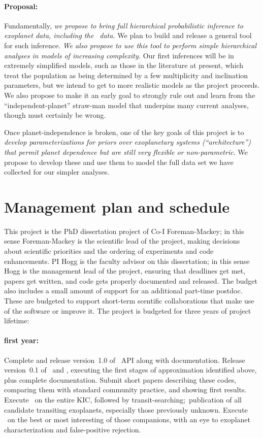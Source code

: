 \documentclass[letterpaper,12pt,preprint]{hack_aastex}
\newcommand{\kplr}{\package{kplr}}
\newcommand{\Untrendy}{\package{Untrendy}}
\newcommand{\Bart}{\package{Bart}}
\begin{document}
\paragraph{Proposal:}
Fundamentally, \emph{we propose to bring full hierarchical
  probabilistic inference to exoplanet data, including the
  \Kepler\ data.}  We plan to build and release a general tool for
such inference.  \emph{We also propose to use this tool to perform
  simple hierarchical analyses in models of increasing complexity.}
Our first inferences will be in extremely simplified models, such as
those in the literature at present, which treat the population as
being determined by a few multiplicity and inclination parameters, but
we intend to get to more realistic models as the project proceeds.  We
also propose to make it an early goal to strongly rule out and learn
from the ``independent-planet'' straw-man model that underpins many
current analyses, though must certainly be wrong.

Once planet-independence is broken, one of the key goals of this
project is to \emph{develop parameterizations for priors over
  exoplanetary systems (``architecture'') that permit planet
  dependence but are still very flexible or non-parametric}.  We
propose to develop these and use them to model the full data set we
have collected for our simpler analyses.


\section{Management plan and schedule}

This project is the PhD dissertation project of Co-I Foreman-Mackey;
in this sense Foreman-Mackey is the scientific lead of the project,
making decisions about scientific priorities and the ordering of
experiments and code enhancements.  PI Hogg is the faculty advisor on
this dissertation; in this sense Hogg is the management lead of the
project, ensuring that deadlines get met, papers get written, and code
gets properly documented and released.  The budget also includes a
small amount of support for an additional part-time
postdoc.  These are budgeted to support short-term scentific
collaborations that make use of the software or improve it.
The project is budgeted for three years of project lifetime:

\paragraph{first year:}
Complete and release version~1.0 of \kplr\ API along with
documentation.
Release version~0.1
of \Untrendy\ and \Bart, executing the first stages of
approximation identified above, plus complete documentation.  Submit short
papers describing these codes, comparing them with standard community
practice, and showing first results.
Execute \Untrendy\ on the entire KIC, followed by transit-searching;\
publication of all candidate transiting exoplanets, especially those
previously unknown.  Execute \Bart\ on the best or most interesting of
those companions, with an eye to exoplanet characterization and
false-positive rejection.
\end{document}
